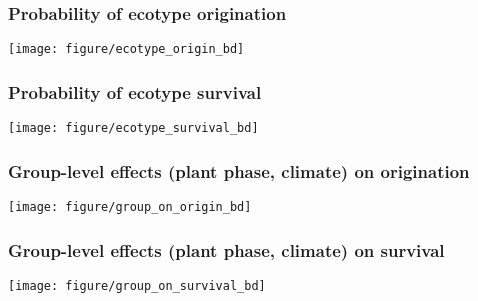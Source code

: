 \documentclass{beamer}
\begin{document}
\begin{frame}
  \frametitle{Probability of ecotype origination}
  \begin{center}
    \texttt{[image: figure/ecotype\_origin\_bd]}
  \end{center}
\end{frame}

\begin{frame}
  \frametitle{Probability of ecotype survival}
  \begin{center}
    \texttt{[image: figure/ecotype\_survival\_bd]}
  \end{center}
\end{frame}

\begin{frame}
  \frametitle{Group-level effects (plant phase, climate) on origination}
  \begin{center}
    \texttt{[image: figure/group\_on\_origin\_bd]}
  \end{center}
\end{frame}

\begin{frame}
  \frametitle{Group-level effects (plant phase, climate) on survival}
  \begin{center}
    \texttt{[image: figure/group\_on\_survival\_bd]}
  \end{center}
\end{frame}

%
%
\end{document}
